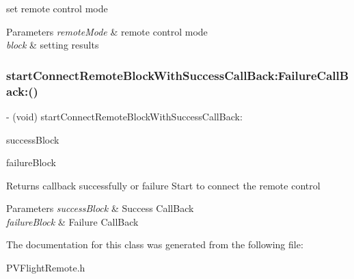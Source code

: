 set remote control mode


\begin{DoxyParams}{Parameters}
{\em remote\+Mode} & remote control mode \\
\hline
{\em block} & setting results \\
\hline
\end{DoxyParams}
\mbox{\label{interface_p_v_flight_remote_ab89720a2eb5c454cae9b9089d265ba1b}} 
\subsubsection{\texorpdfstring{start\+Connect\+Remote\+Block\+With\+Success\+Call\+Back\+:\+Failure\+Call\+Back\+:()}{startConnectRemoteBlockWithSuccessCallBack:FailureCallBack:()}}
{\footnotesize\ttfamily -\/ (void) start\+Connect\+Remote\+Block\+With\+Success\+Call\+Back\+: \begin{DoxyParamCaption}\item[{(P\+V\+Completion\+Block)}]{success\+Block }\item[{FailureCallBack:(P\+V\+Completion\+Block)}]{failure\+Block }\end{DoxyParamCaption}}

\begin{DoxyReturn}{Returns}
callback successfully or failure Start to connect the remote control
\end{DoxyReturn}

\begin{DoxyParams}{Parameters}
{\em success\+Block} & Success Call\+Back \\
\hline
{\em failure\+Block} & Failure Call\+Back \\
\hline
\end{DoxyParams}


The documentation for this class was generated from the following file\+:\begin{DoxyCompactItemize}
\item 
P\+V\+Flight\+Remote.\+h\end{DoxyCompactItemize}
